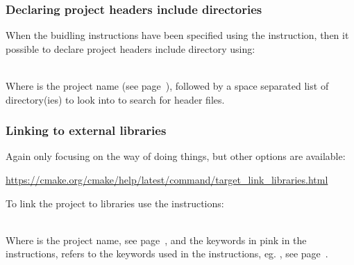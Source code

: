 \subsubsection*{Declaring project headers include directories}

When the buidling instructions have been specified using the  instruction, then it possible to declare project headers include directory using: 
\begin{script}
\end{script} \\[-0.5cm]
\noindent Where  is the project name (see page~\pageref{cmake_pname}), followed by a space separated list of directory(ies) to look into to search for header files. 

\subsubsection*{Linking to external libraries}
\label{clink}
Again only focusing on the  way of doing things, but other options are available:
\begin{center}\href{https://cmake.org/cmake/help/latest/command/target\_link\_libraries.html}{https://cmake.org/cmake/help/latest/command/target\_link\_libraries.html} \end{center}
To link the project to libraries use the  instructions:
\begin{script}
\end{script}
\\[-0.25cm]
\noindent Where  is the project name, see page~\pageref{cmake_pname}, and the keywords in pink in the  instructions, 
refers to the keywords used in the  instructions, eg. \texttt{}, see page~\pageref{cmake_deps}.


